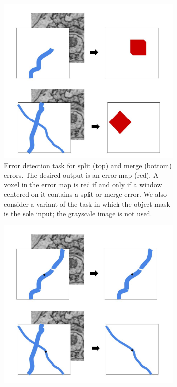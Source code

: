 \documentclass{article}
\begin{document}
\begin{figure}[t!]
	\begin{center}
	\begin{subfigure}[t]{0.45\textwidth}
		\includegraphics[width=1.0\linewidth]{detection_task.jpg}
		\caption{Error detection task for split (top) and merge (bottom) errors. The desired output is an error map (red). A voxel in the error map is red if and only if a window centered on it contains a split or merge error. We also consider a variant of the task in which the object mask is the sole input; the grayscale image is not used.}
		\label{fig:error_detection_cartoon}
	\end{subfigure}
\hfill
	\begin{subfigure}[t]{0.45\textwidth}
	\includegraphics[width=1.0\linewidth]{correction_task.jpg}

\end{subfigure}
\end{center}
\end{figure}
\end{document}
